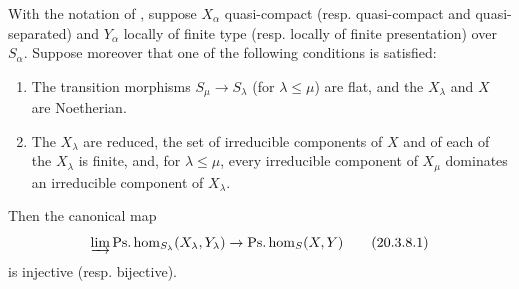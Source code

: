 \begin{proposition}[20.3.8]\label{IV.20.3.8}
With the notation of , suppose $X_\alpha$ quasi-compact \textup{(resp.} quasi-compact and quasi-separated) and $Y_\alpha$ locally of finite type \textup{(resp.} locally of finite presentation) over $S_\alpha$.
Suppose moreover that one of the following conditions is satisfied:
\begin{enumerate}[label=\emph{(\roman*)}]
  \item The transition morphisms $S_\mu\to S_\lambda$ (for $\lambda\leq\mu$) are flat, and the $X_\lambda$ and $X$ are Noetherian.
  \item The $X_\lambda$ are reduced, the set of irreducible components of $X$ and of each of the $X_\lambda$ is finite, and, for $\lambda\leq\mu$, every irreducible component of $X_\mu$ dominates an irreducible component of $X_\lambda$.
\end{enumerate}
Then the canonical map
\[
\label{IV.20.3.8.1}
  \varinjlim\operatorname{Ps.hom}_{S_\lambda}(X_\lambda,Y_\lambda)\to\operatorname{Ps.hom}_S(X,Y)
  \tag{20.3.8.1}
\]
is injective \textup{(resp.} bijective).
\end{proposition}

